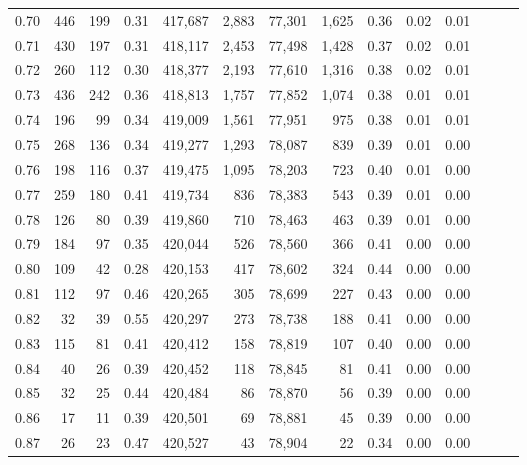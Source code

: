 \begin{tabular}{rrrrrrrrrrrrrr}
0.70 &     446 &    199 &  0.31 &  417,687 &    2,883 &  77,301 &   1,625 &  0.36 &  0.02 &      0.01 \\
0.71 &     430 &    197 &  0.31 &  418,117 &    2,453 &  77,498 &   1,428 &  0.37 &  0.02 &      0.01 \\
0.72 &     260 &    112 &  0.30 &  418,377 &    2,193 &  77,610 &   1,316 &  0.38 &  0.02 &      0.01 \\
0.73 &     436 &    242 &  0.36 &  418,813 &    1,757 &  77,852 &   1,074 &  0.38 &  0.01 &      0.01 \\
0.74 &     196 &     99 &  0.34 &  419,009 &    1,561 &  77,951 &     975 &  0.38 &  0.01 &      0.01 \\
0.75 &     268 &    136 &  0.34 &  419,277 &    1,293 &  78,087 &     839 &  0.39 &  0.01 &      0.00 \\
0.76 &     198 &    116 &  0.37 &  419,475 &    1,095 &  78,203 &     723 &  0.40 &  0.01 &      0.00 \\
0.77 &     259 &    180 &  0.41 &  419,734 &      836 &  78,383 &     543 &  0.39 &  0.01 &      0.00 \\
0.78 &     126 &     80 &  0.39 &  419,860 &      710 &  78,463 &     463 &  0.39 &  0.01 &      0.00 \\
0.79 &     184 &     97 &  0.35 &  420,044 &      526 &  78,560 &     366 &  0.41 &  0.00 &      0.00 \\
0.80 &     109 &     42 &  0.28 &  420,153 &      417 &  78,602 &     324 &  0.44 &  0.00 &      0.00 \\
0.81 &     112 &     97 &  0.46 &  420,265 &      305 &  78,699 &     227 &  0.43 &  0.00 &      0.00 \\
0.82 &      32 &     39 &  0.55 &  420,297 &      273 &  78,738 &     188 &  0.41 &  0.00 &      0.00 \\
0.83 &     115 &     81 &  0.41 &  420,412 &      158 &  78,819 &     107 &  0.40 &  0.00 &      0.00 \\
0.84 &      40 &     26 &  0.39 &  420,452 &      118 &  78,845 &      81 &  0.41 &  0.00 &      0.00 \\
0.85 &      32 &     25 &  0.44 &  420,484 &       86 &  78,870 &      56 &  0.39 &  0.00 &      0.00 \\
0.86 &      17 &     11 &  0.39 &  420,501 &       69 &  78,881 &      45 &  0.39 &  0.00 &      0.00 \\
0.87 &      26 &     23 &  0.47 &  420,527 &       43 &  78,904 &      22 &  0.34 &  0.00 &      0.00 \\

\end{tabular}
